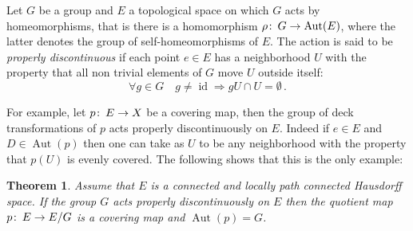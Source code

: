 \documentclass[12pt]{article}
\newtheorem*{Thm}{Theorem}
\theoremstyle{definition}
\theoremstyle{remark}
\numberwithin{equation}{subsection}
\newcommand{\Gr}{\rho}
\def\co{\colon\thinspace}
\newcommand{\Au}{ \operatorname{Aut}}
\newcommand{\id}{\operatorname{id}}
\begin{document}
Let $G$ be a group and $E$ a topological space on which $G$ acts by
homeomorphisms, that is there is a homomorphism $\Gr\co G\to \Au(E)$, where
the latter denotes the group of self-homeomorphisms of $E$. The action is
said to be \emph{properly discontinuous} if each point $e\in E$ has a
neighborhood $U$ with the property that all non trivial elements of $G$ move
$U$ outside itself:
$$\forall g\in G\quad g \neq  \id\Rightarrow gU\cap U=\emptyset\,.$$

For example, let $p\co E\to X$ be a covering map, then the group of deck
transformations of $p$ acts properly discontinuously on $E$. Indeed if $e\in
E$ and $D\in \Au(p)$ then one can take as $U$ to be any neighborhood with
the property that $p(U)$ is evenly covered.  The following shows that this
is the only example:

\begin{Thm}
Assume that $E$ is a connected and locally path connected Hausdorff
space. If the group $G$ acts properly discontinuously on $E$ then the
quotient map $p\co E\to E/G$ is a covering map and $\Au(p)=G$.   
\end{Thm}
\end{document}

